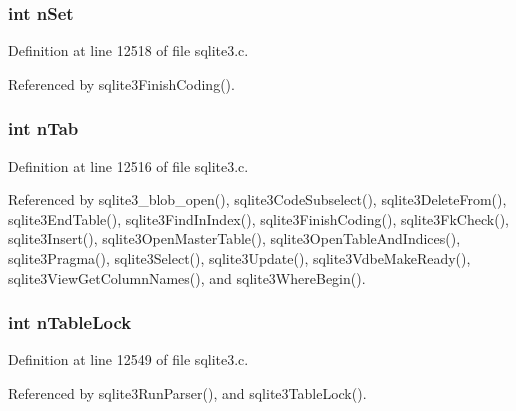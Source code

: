 \hypertarget{struct_parse_a46b5e828fc2b936c5f110ed39acbab4c}{}
\subsubsection[{n\+Set}]{\setlength{\rightskip}{0pt plus 5cm}int n\+Set}\label{struct_parse_a46b5e828fc2b936c5f110ed39acbab4c}


Definition at line 12518 of file sqlite3.\+c.



Referenced by sqlite3\+Finish\+Coding().

\hypertarget{struct_parse_ad80776c870a2ec9334ba0d32de602aa4}{}
\subsubsection[{n\+Tab}]{\setlength{\rightskip}{0pt plus 5cm}int n\+Tab}\label{struct_parse_ad80776c870a2ec9334ba0d32de602aa4}


Definition at line 12516 of file sqlite3.\+c.



Referenced by sqlite3\+\_\+blob\+\_\+open(), sqlite3\+Code\+Subselect(), sqlite3\+Delete\+From(), sqlite3\+End\+Table(), sqlite3\+Find\+In\+Index(), sqlite3\+Finish\+Coding(), sqlite3\+Fk\+Check(), sqlite3\+Insert(), sqlite3\+Open\+Master\+Table(), sqlite3\+Open\+Table\+And\+Indices(), sqlite3\+Pragma(), sqlite3\+Select(), sqlite3\+Update(), sqlite3\+Vdbe\+Make\+Ready(), sqlite3\+View\+Get\+Column\+Names(), and sqlite3\+Where\+Begin().

\hypertarget{struct_parse_a089d91549eb1eb389c4a660bb3e8a6c0}{}
\subsubsection[{n\+Table\+Lock}]{\setlength{\rightskip}{0pt plus 5cm}int n\+Table\+Lock}\label{struct_parse_a089d91549eb1eb389c4a660bb3e8a6c0}


Definition at line 12549 of file sqlite3.\+c.



Referenced by sqlite3\+Run\+Parser(), and sqlite3\+Table\+Lock().

\hypertarget{struct_parse_a41f182977278836caadbc1a77ee4a7fc}{}
